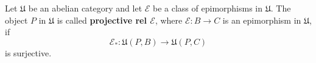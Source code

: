 Let $\mathfrak{U}$ be an abelian category and let $\mathcal{E}$ be a class of epimorphisms in $\mathfrak{U}$. The object $P$ in $\mathfrak{U}$ is called \textbf{projective rel $\mathcal{E}$}, where $\mathcal{E} : B \rightarrow C$ is an epimorphism in $\mathfrak{U}$, if
$$\mathcal{E}_* : \mathfrak{U}(P, B) \rightarrow \mathfrak{U}(P, C)$$
is surjective.

